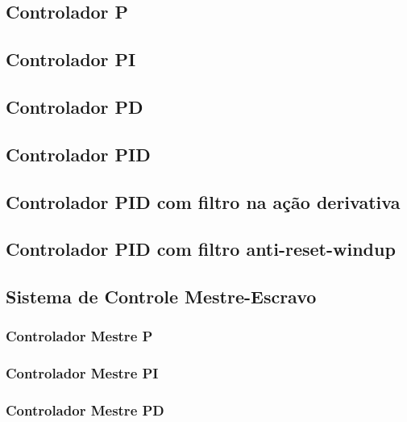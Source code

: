 \documentclass[a4paper,12pt]{article}
\begin{document}
\subsection{Controlador P}\hspace{4ex}

\subsection{Controlador PI}\hspace{4ex}

\subsection{Controlador PD}\hspace{4ex}

\subsection{Controlador PID}\hspace{4ex}

\subsection{Controlador PID com filtro na ação derivativa}\hspace{4ex}

\subsection{Controlador PID com filtro anti-reset-windup}\hspace{4ex}

\subsection{Sistema de Controle Mestre-Escravo}

\subsubsection{Controlador Mestre P}

\subsubsection{Controlador Mestre PI}

\subsubsection{Controlador Mestre PD}
\end{document}
